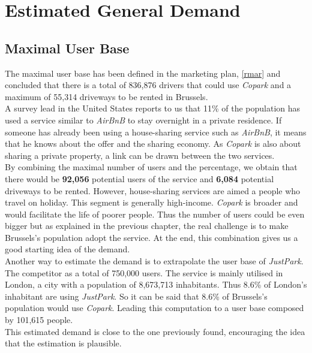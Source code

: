 \documentclass[12pt,a4paper,oneside]{book}
\newcommand{\bp}{\textit{Copark}}
\begin{document}
\section{Estimated General Demand}

\subsection{Maximal User Base}

\label{mubsec}

The maximal user base has been defined in the marketing plan, \autoref{rmar} and concluded that there is a total of 836,876 drivers that could use \bp{} and a maximum of 55,314 driveways to be rented in Brussels.\\

A survey lead in the United States reports to us that 11\% of the population has used a service similar to \textit{AirBnB} to stay overnight in a private residence.\cite{airbnbuse} If someone has already been using a house-sharing service such as \textit{AirBnB}, it means that he knows about the offer and the sharing economy. As \bp{} is also about sharing a private property, a link can be drawn between the two services.\\

By combining the maximal number of users and the percentage, we obtain that there would be \textbf{92,056} potential users of the service and \textbf{6,084} potential driveways to be rented. However, house-sharing services are aimed a people who travel on holiday. This segment is generally high-income. \bp{} is broader and would facilitate the life of poorer people. Thus the number of users could be even bigger but as explained in the previous chapter, the real challenge is to make Brussels's population adopt the service. At the end, this combination gives us a good starting idea of the demand.\\

Another way to estimate the demand is to extrapolate the user base of \textit{JustPark}. The competitor as a total of 750,000 users.\cite{jpu} The service is mainly utilised in London, a city with a population of 8,673,713 inhabitants.\cite{ciafb} Thus 8.6\% of London's inhabitant are using \textit{JustPark}. So it can be said that 8.6\% of Brussels's population would use \bp{}. Leading this computation to a user base composed by 101,615 people.\\

This estimated demand is close to the one previously found, encouraging the idea that the estimation is plausible.\\
\end{document}

